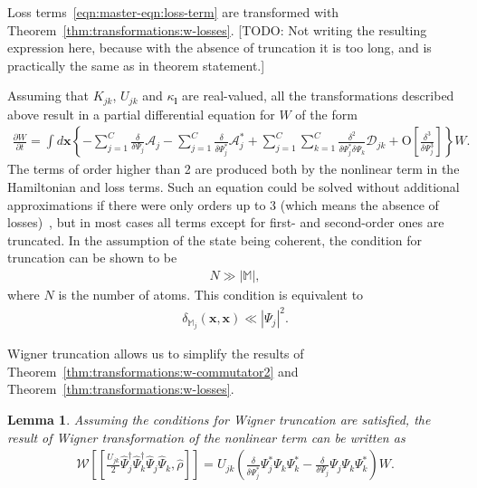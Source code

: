\documentclass[12pt,aip,jmp,amssymb,amsmath]{revtex4-1}
\newtheorem{lemma}{Lemma}
\begin{document}
Loss terms~\ref{eqn:master-eqn:loss-term} are transformed with Theorem~\ref{thm:transformations:w-losses}.
[TODO: Not writing the resulting expression here, because with the absence of truncation it is too long, and is practically the same as in theorem statement.]

Assuming that $K_{jk}$, $U_{jk}$ and $\kappa_{\boldsymbol{l}}$ are real-valued, all the transformations described above result in a partial differential equation for $W$ of the form
\begin{equation}\begin{split}
    \frac{\partial W}{\partial t} = \int d\boldsymbol{x} \left\{
        - \sum_{j=1}^C \frac{\delta}{\delta \Psi_j} \mathcal{A}_j
        - \sum_{j=1}^C \frac{\delta}{\delta \Psi_j^*} \mathcal{A}_j^*
        + \sum_{j=1}^C \sum_{k=1}^C \frac{\delta^2}{\delta \Psi_j^* \delta \Psi_k} \mathcal{D}_{jk}
        + \mbox{O} \left[ \frac{\delta^3}{\delta\Psi_j^3} \right]
    \right\} W.
\end{split}\end{equation}
The terms of order higher than 2 are produced both by the nonlinear term in the Hamiltonian and loss terms.
Such an equation could be solved without additional approximations if there were only orders up to 3 (which means the absence of losses)~\cite{Polkovnikov2003}, but in most cases all terms except for first- and second-order ones are truncated.
In the assumption of the state being coherent, the condition for truncation can be shown to be~\cite{Sinatra2002}
\begin{equation}\begin{split}
    N \gg |\mathbb{M}|,
\end{split}\end{equation}
where $N$ is the number of atoms.
This condition is equivalent to~\cite{Norrie2006}
\begin{equation}\begin{split}
    \delta_{\mathbb{M}_j}(\boldsymbol{x}, \boldsymbol{x}) \ll | \Psi_j |^2.
\end{split}\end{equation}

Wigner truncation allows us to simplify the results of Theorem~\ref{thm:transformations:w-commutator2} and Theorem~\ref{thm:transformations:w-losses}.

\begin{lemma}
    Assuming the conditions for Wigner truncation are satisfied,
    the result of Wigner transformation of the nonlinear term can be written as
    \begin{equation*}\begin{split}
        \mathcal{W} \left[
            [
                \frac{U_{jk}}{2}
                    \hat{\Psi}_j^\dagger \hat{\Psi}_k^\dagger \hat{\Psi}_j \hat{\Psi}_k,
                \hat{\rho}
            ]
        \right]
        = U_{jk} \left(
            \frac{\delta}{\delta \Psi_j^*} \Psi_j^* \Psi_k \Psi_k^*
            - \frac{\delta}{\delta \Psi_j} \Psi_j \Psi_k \Psi_k^*
        \right) W.
    \end{split}\end{equation*}
\end{lemma}
\end{document}
